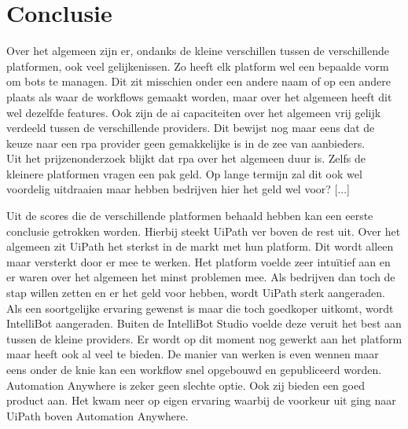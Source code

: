 
\chapter{Conclusie}
\label{ch:conclusie}

Over het algemeen zijn er, ondanks de kleine verschillen tussen de verschillende platformen, ook veel gelijkenissen. Zo heeft elk platform wel een bepaalde vorm om bots te managen. Dit zit misschien onder een andere naam of op een andere plaats als waar de workflows gemaakt worden, maar over het algemeen heeft dit wel dezelfde features. Ook zijn de \acrshort{ai} capaciteiten over het algemeen vrij gelijk verdeeld tussen de verschillende providers. Dit bewijst nog maar eens dat de keuze naar een \acrshort{rpa} provider geen gemakkelijke is in de zee van aanbieders.\\
Uit het prijzenonderzoek blijkt dat \acrshort{rpa} over het algemeen duur is. Zelfs de kleinere platformen vragen een pak geld. Op lange termijn zal dit ook wel voordelig uitdraaien maar hebben bedrijven hier het geld wel voor? [...]

Uit de scores die de verschillende platformen behaald hebben kan een eerste conclusie getrokken worden. Hierbij steekt UiPath ver boven de rest uit. Over het algemeen zit UiPath het sterkst in de markt met hun platform. Dit wordt alleen maar versterkt door er mee te werken. Het platform voelde zeer intuïtief aan en er waren over het algemeen het minst problemen mee. Als bedrijven dan toch de stap willen zetten en er het geld voor hebben, wordt UiPath sterk aangeraden.\\
Als een soortgelijke ervaring gewenst is maar die toch goedkoper uitkomt, wordt IntelliBot aangeraden. Buiten de IntelliBot Studio voelde deze veruit het best aan tussen de kleine providers. Er wordt op dit moment nog gewerkt aan het platform maar heeft ook al veel te bieden. De manier van werken is even wennen maar eens onder de knie kan een workflow snel opgebouwd en gepubliceerd worden. \\
Automation Anywhere is zeker geen slechte optie. Ook zij bieden een goed product aan. Het kwam neer op eigen ervaring waarbij de voorkeur uit ging naar UiPath boven Automation Anywhere.

